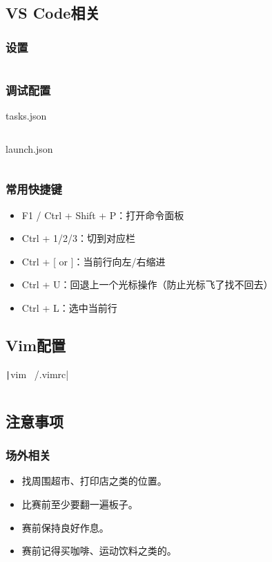 \documentclass[a4paper, twoside]{article}
\begin{document}
\subsection{VS Code相关}
    \subsubsection{设置}
    \inputminted{json}{../src/附录/VSCode/settings.json}

    \subsubsection{调试配置}
    tasks.json
    \inputminted{json}{../src/附录/VSCode/tasks.json}
    launch.json
    \inputminted{json}{../src/附录/VSCode/launch.json}

    \subsubsection{常用快捷键}
    \begin{itemize}
        \item F1 / Ctrl + Shift + P：打开命令面板
        \item Ctrl + 1/2/3：切到对应栏
        \item Ctrl + [ or ]：当前行向左/右缩进
        \item Ctrl + U：回退上一个光标操作（防止光标飞了找不回去）
        \item Ctrl + L：选中当前行
    \end{itemize}

\subsection{Vim配置}
\texttt|vim ~/.vimrc|
\inputminted{bash}{../src/附录/vim配置.sh}

\subsection{注意事项}

    \subsubsection{场外相关}
    \begin{itemize}
        \item 找周围超市、打印店之类的位置。
        \item 比赛前至少要翻一遍板子。
        \item 赛前保持良好作息。
        \item 赛前记得买咖啡、运动饮料之类的。
    \end{itemize}
\end{document}
